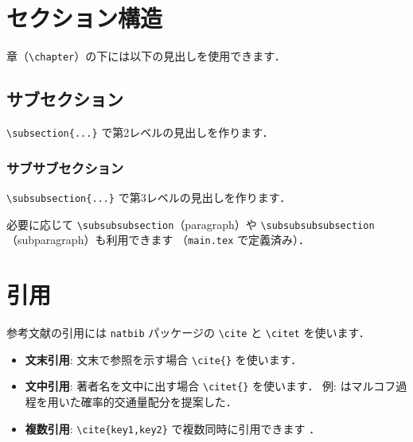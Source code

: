 \section{セクション構造}

章（\verb|\chapter|）の下には以下の見出しを使用できます．

\subsection{サブセクション}

\verb|\subsection{...}| で第2レベルの見出しを作ります．

\subsubsection{サブサブセクション}

\verb|\subsubsection{...}| で第3レベルの見出しを作ります．

必要に応じて \verb|\subsubsubsection|（paragraph）や
\verb|\subsubsubsubsection|（subparagraph）も利用できます
（\texttt{main.tex} で定義済み）．

\section{引用}
\label{sec:cite}

参考文献の引用には \texttt{natbib} パッケージの
\verb|\cite| と \verb|\citet| を使います．

\begin{itemize}
  \item \textbf{文末引用}: 文末で参照を示す場合 \verb|\cite{}| を使います\cite{Ben-Akiva1985}．
  \item \textbf{文中引用}: 著者名を文中に出す場合 \verb|\citet{}| を使います．
        例: \citet{Akamatsu1996} はマルコフ過程を用いた確率的交通量配分を提案した．
  \item \textbf{複数引用}: \verb|\cite{key1,key2}| で複数同時に引用できます
        \cite{Akamatsu1996,Ben-Akiva1985}．
\end{itemize}

